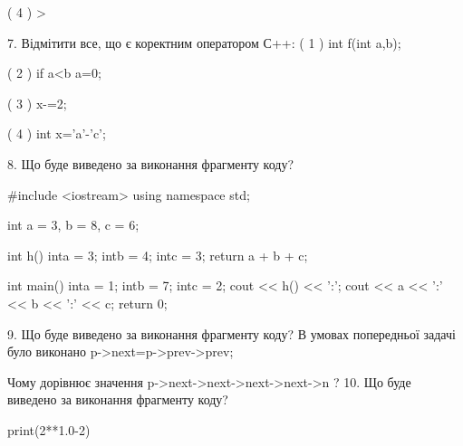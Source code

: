 \documentclass[11pt]{article}
\begin{document}
( 4 ) >

7. Відмітити все, що є коректним оператором С++:
( 1 ) int f(int a,b);

( 2 ) if a<b a=0;

( 3 ) x-=2;

( 4 ) int x='a'-'c';

8. Що буде виведено за виконання фрагменту коду?

#include <iostream>
using namespace std;

int a = 3, b = 8, c = 6;

int h(){
    inta = 3;
    intb = 4;
    intc = 3;
    return a + b + c;
}

int main(){
    inta = 1;
    intb = 7;
    intc = 2;
    cout << h() << ':';
    cout << a << ':' << b << ':' << c;
    return 0;
}

9. Що буде виведено за виконання фрагменту коду?
В умовах попередньої задачі було виконано p->next=p->prev->prev;

Чому дорівнює значення p->next->next->next->next->n ?
10. Що буде виведено за виконання фрагменту коду?

print(2**1.0-2)











\newpage
\end{document}
